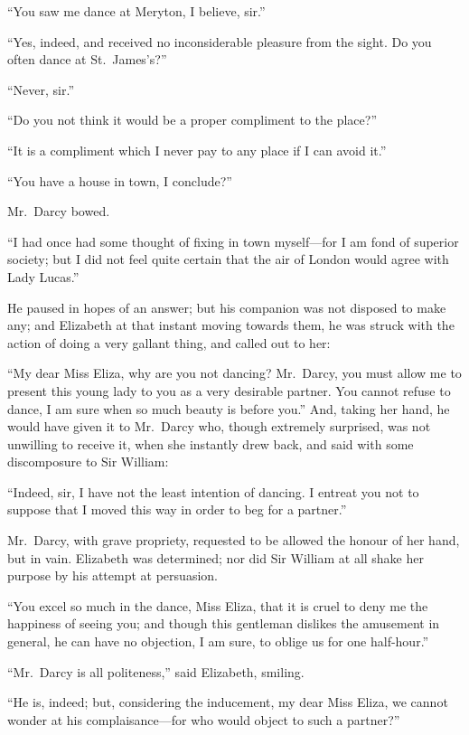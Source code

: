 \documentclass[12pt,english,oneside]{book}
\begin{document}
{}``You saw me dance at Meryton, I believe, sir.''

{}``Yes, indeed, and received no inconsiderable pleasure from the
sight. Do you often dance at St.\ James's?''\ 

{}``Never, sir.''

{}``Do you not think it would be a proper compliment to the place?''\ 

{}``It is a compliment which I never pay to any place if I can avoid
it.''

{}``You have a house in town, I conclude?''\ 

Mr.\ Darcy bowed.

{}``I had once had some thought of fixing in town myself\mbox{---}for
I am fond of superior society; but I did not feel quite certain that
the air of London would agree with Lady Lucas.''

He paused in hopes of an answer; but his companion was not disposed
to make any; and Elizabeth at that instant moving towards them, he
was struck with the action of doing a very gallant thing, and called
out to her:

{}``My dear Miss Eliza, why are you not dancing? Mr.\ Darcy, you
must allow me to present this young lady to you as a very desirable
partner. You cannot refuse to dance, I am sure when so much beauty
is before you.'' And, taking her hand, he would have given it to
Mr.\ Darcy who, though extremely surprised, was not unwilling to
receive it, when she instantly drew back, and said with some discomposure
to Sir William:

{}``Indeed, sir, I have not the least intention of dancing. I entreat
you not to suppose that I moved this way in order to beg for a partner.''

Mr.\ Darcy, with grave propriety, requested to be allowed the honour
of her hand, but in vain. Elizabeth was determined; nor did Sir William
at all shake her purpose by his attempt at persuasion.

{}``You excel so much in the dance, Miss Eliza, that it is cruel
to deny me the happiness of seeing you; and though this gentleman
dislikes the amusement in general, he can have no objection, I am
sure, to oblige us for one half-hour.''

{}``Mr.\ Darcy is all politeness,'' said Elizabeth, smiling.

{}``He is, indeed; but, considering the inducement, my dear Miss
Eliza, we cannot wonder at his complaisance\mbox{---}for who would
object to such a partner?''\ 
\end{document}
